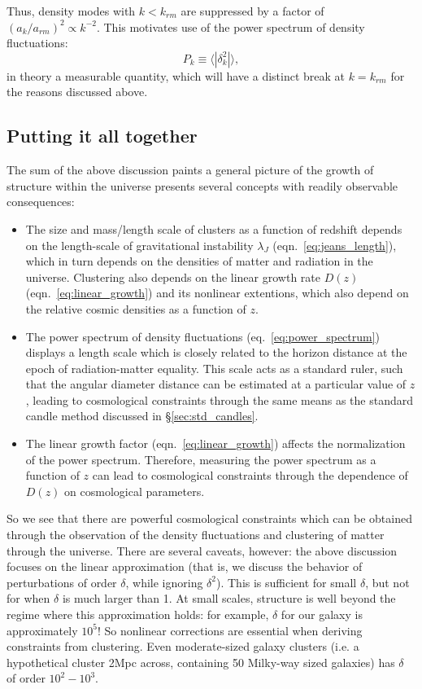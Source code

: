Thus, density modes with $k < k_{rm}$ are suppressed by a factor of
$(a_k / a_{rm})^2 \propto k^{-2}$.  This motivates use of the power
spectrum of density fluctuations:
\begin{equation}
  \label{eq:power_spectrum}
  P_k \equiv \langle|\delta_k^2|\rangle,
\end{equation}
in theory a measurable quantity, which will have a distinct break at
$k = k_{rm}$ for the reasons discussed above.

\subsection{Putting it all together}
The sum of the above discussion paints a general picture of the growth of
structure within the universe presents several concepts with readily
observable consequences:

\begin{itemize}
  \item The size and mass/length scale of clusters as a function of redshift
    depends on the length-scale of gravitational instability $\lambda_J$
    (eqn.~\ref{eq:jeans_length}),
    which in turn depends on the densities of matter and radiation in the
    universe.  Clustering also depends on the linear growth rate
    $D(z)$ (eqn.~\ref{eq:linear_growth}) and its nonlinear extentions,
    which also depend on the relative cosmic densities as a function of $z$.
  \item The power spectrum of density fluctuations (eq.~\ref{eq:power_spectrum})
    displays a length scale which is closely related to the horizon distance
    at the epoch of radiation-matter equality.  This scale acts as a standard
    ruler, such that the angular diameter distance can be estimated at a
    particular value of $z$, leading to cosmological constraints through the
    same means as the standard candle method discussed in
    \S\ref{sec:std_candles}.
  \item The linear growth factor (eqn.~\ref{eq:linear_growth}) affects the
    normalization of the power spectrum.  Therefore, measuring the power
    spectrum as a function of $z$ can lead to cosmological constraints
    through the dependence of $D(z)$ on cosmological parameters.
\end{itemize}

So we see that there are powerful cosmological constraints which can be
obtained through the observation of the density fluctuations and clustering
of matter through the universe.  There are several caveats, however:
the above discussion focuses on the linear approximation (that is, we
discuss the behavior of perturbations of order $\delta$, while ignoring
$\delta^2$).  This is sufficient for small $\delta$, but not for when
$\delta$ is much larger than 1.  At small scales, structure is well beyond
the regime where this approximation holds: for example, $\delta$ for our
galaxy is approximately $10^5$!  So nonlinear corrections are essential when
deriving constraints from clustering.  Even moderate-sized galaxy clusters
(i.e. a hypothetical cluster 2Mpc across, containing 50 Milky-way
sized galaxies) has $\delta$ of order $10^2-10^3$.

